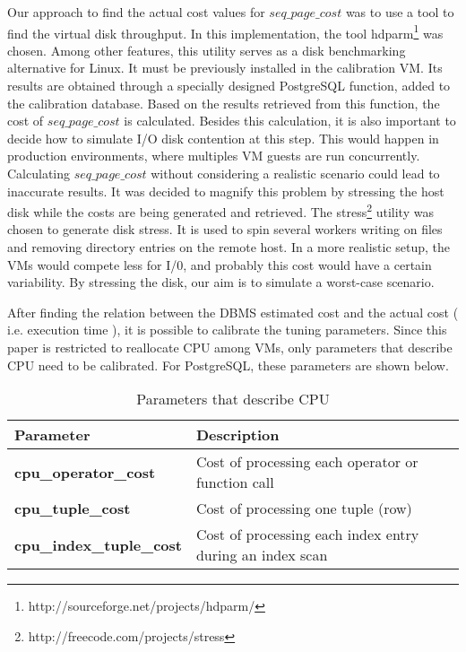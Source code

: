 Our approach to find the actual cost values for $seq\_page\_cost$ was to use a tool to find the virtual disk throughput. In this implementation, the tool hdparm\footnote{http://sourceforge.net/projects/hdparm/} was chosen. Among other features, this utility serves as a disk benchmarking alternative for Linux. It must be previously installed in the calibration VM. Its results are obtained through a specially designed PostgreSQL function, added to the calibration database. Based on the results retrieved from this function, the cost of $seq\_page\_cost$ is calculated. Besides this calculation, it is also important to decide how to simulate I/O disk contention at this step. This would happen in production environments, where multiples VM guests are run concurrently. Calculating $seq\_page\_cost$ without considering a realistic scenario could lead to inaccurate results. It was decided to magnify this problem by stressing the host disk while the costs are being generated and retrieved. The stress\footnote{
http://freecode.com/projects/stress} utility was chosen to generate disk stress. It is used to spin several 
workers writing on files and removing directory entries on the remote host. In a more realistic setup, the VMs would compete less for I/0, and probably this cost would have a certain variability. By stressing the disk, our aim is to simulate a worst-case scenario. 


After finding the relation between the DBMS estimated cost and the actual cost ( i.e. execution time ), it is possible to calibrate the tuning parameters. Since this paper is restricted to reallocate CPU among VMs, only parameters that describe CPU need to be calibrated. For PostgreSQL, these parameters are shown below.

\begin{table}[ht]
    \centering
    \begin{tabular}{ | l | p{5cm} |}
    \hline
    Parameter & Description  \\ \hline
    \textbf{cpu\_operator\_cost} & Cost of processing each operator or function call \\ \hline
    \textbf{cpu\_tuple\_cost} & Cost of processing one tuple (row) \\ \hline
    \textbf{cpu\_index\_tuple\_cost} & Cost of processing each index entry during an index scan  \\
    \hline
    \end{tabular}
    \caption{Parameters that describe CPU}
    \label{table:descriptive}
\end{table}


